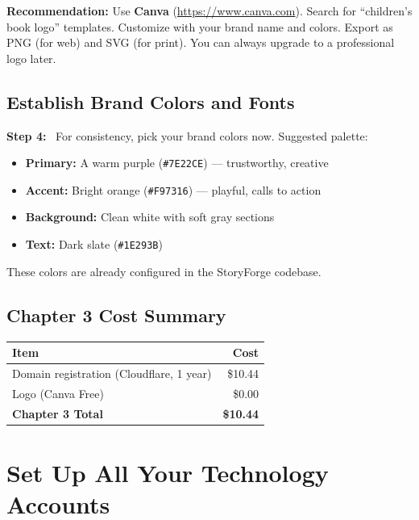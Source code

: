 \documentclass[12pt, letterpaper, oneside]{book}
\newcommand{\step}[1]{\noindent\textbf{\textcolor{primary}{Step #1:}}~}
\begin{document}
\begin{infobox}
\textbf{Recommendation:} Use \textbf{Canva} (\url{https://www.canva.com}). Search for ``children's book logo'' templates. Customize with your brand name and colors. Export as PNG (for web) and SVG (for print). You can always upgrade to a professional logo later.
\end{infobox}

\section{Establish Brand Colors and Fonts}

\step{4} For consistency, pick your brand colors now. Suggested palette:
\begin{itemize}[leftmargin=2em]
  \item \textbf{Primary:} A warm purple (\texttt{\#7E22CE}) --- trustworthy, creative
  \item \textbf{Accent:} Bright orange (\texttt{\#F97316}) --- playful, calls to action
  \item \textbf{Background:} Clean white with soft gray sections
  \item \textbf{Text:} Dark slate (\texttt{\#1E293B})
\end{itemize}

\noindent These colors are already configured in the StoryForge codebase.

\section{Chapter 3 Cost Summary}

\begin{table}[H]
\centering
\begin{tabular}{lr}
\toprule
\textbf{Item} & \textbf{Cost} \\
\midrule
Domain registration (Cloudflare, 1 year) & \$10.44 \\
Logo (Canva Free) & \$0.00 \\
\midrule
\textbf{Chapter 3 Total} & \textbf{\$10.44} \\
\bottomrule
\end{tabular}
\end{table}

\chapter{Set Up All Your Technology Accounts}
\end{document}

